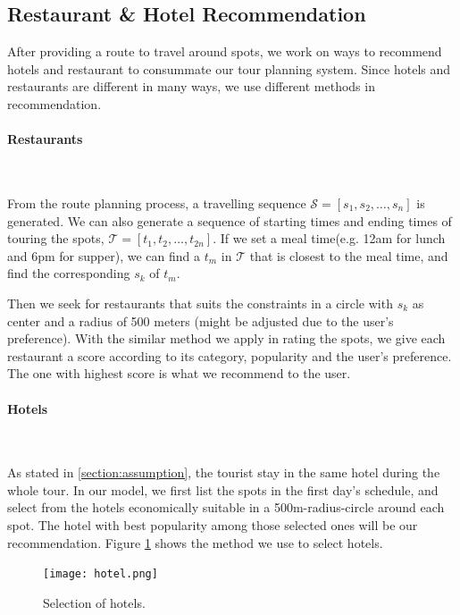 \documentclass{mcmthesis}
\begin{document}
\subsection{Restaurant \& Hotel Recommendation}
  After providing a route to travel around spots, we work on ways to recommend hotels and restaurant to consummate our tour planning system. Since hotels and restaurants are different in many ways, we use different methods in recommendation.
  \paragraph{Restaurants}\
  
  From the route planning process, a travelling sequence $\mathscr{S} = [s_{1}, s_{2}, \ldots, s_{n}]$ is generated. We can also generate a sequence of starting times and ending times of touring the spots, $\mathscr{T} = [t_{1}, t_{2}, \ldots, t_{2n}]$. If we set a meal time(e.g. 12am for lunch and 6pm for supper), we can find a $t_{m}$ in $\mathscr{T}$ that is closest to the meal time, and find the corresponding $s_{k}$ of $t_{m}$. \par
  Then we seek for restaurants that suits the constraints in a circle with $s_{k}$ as center and a radius of 500 meters (might be adjusted due to the user's preference). With the similar method we apply in rating the spots, we give each restaurant a score according to its category, popularity and the user's preference. The one with highest score is what we recommend to the user.
  \paragraph{Hotels}\
  
  As stated in \ref{section:assumption}, the tourist stay in the same hotel during the whole tour. In our model, we first list the spots in the first day's schedule, and select from the hotels economically suitable in a 500m-radius-circle around each spot. The hotel with best popularity among those selected ones will be our recommendation. Figure \ref{fig:hotel} shows the method we use to select hotels.
  \begin{figure}[h]
    \centering
    \texttt{[image: hotel.png]}
    \caption{Selection of hotels.}
    \label{fig:hotel}
  \end{figure}
\end{document}

